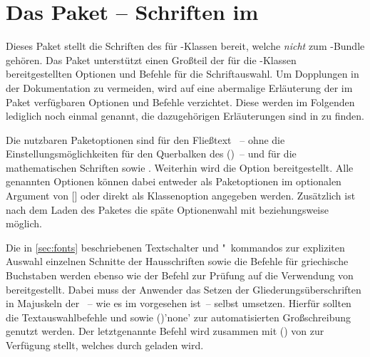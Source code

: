 \begin{Bundle*}{}
\bigskip\noindent
{}%
%
%
\end{Bundle*}



\section{Das Paket  -- Schriften im \CD}
\begin{Bundle*}[v2.02]{}
\printchangedatlist%
%
Dieses Paket stellt die Schriften des \CDs für -Klassen bereit, 
welche \emph{nicht} zum \TUDScript-Bundle gehören. Das Paket unterstützt einen 
Großteil der für die \TUDScript-Klassen bereitgestellten Optionen und Befehle 
für die Schriftauswahl. Um Dopplungen in der Dokumentation zu vermeiden, wird 
auf eine abermalige Erläuterung der im Paket  verfügbaren 
Optionen und Befehle verzichtet. Diese werden im Folgenden lediglich noch 
einmal genannt, die dazugehörigen Erläuterungen sind in  zu 
finden.

Die nutzbaren Paketoptionen sind für den Fließtext ~-- ohne die 
Einstellungsmöglichkeiten für den Querbalken des \CDs ()~-- und 
für die mathematischen Schriften  sowie . 
Weiterhin wird die Option  bereitgestellt. Alle genannten 
Optionen können dabei entweder als Paketoptionen im optionalen Argument von 
[] oder 
direkt als Klassenoption angegeben werden. Zusätzlich ist nach dem Laden des 
Paketes die späte Optionenwahl mit  beziehungsweise 
 möglich.

Die in \autoref{sec:fonts} beschriebenen Textschalter und "~kommandos zur 
expliziten Auswahl einzelnen Schnitte der Hausschriften sowie die Befehle für 
griechische Buchstaben werden ebenso wie der Befehl  zur Prüfung 
auf die Verwendung von \DIN bereitgestellt. Dabei muss der Anwender das Setzen 
der Gliederungsüberschriften in Majuskeln der \DIN~-- wie es im \CD vorgesehen 
ist~-- selbst umsetzen. Hierfür sollten die Textauswahlbefehle  
und  sowie ()'none' zur 
automatisierten Großschreibung genutzt werden. Der letztgenannte Befehl wird 
zusammen mit () von  
zur Verfügung stellt, welches durch  geladen wird.


\end{Bundle*}
